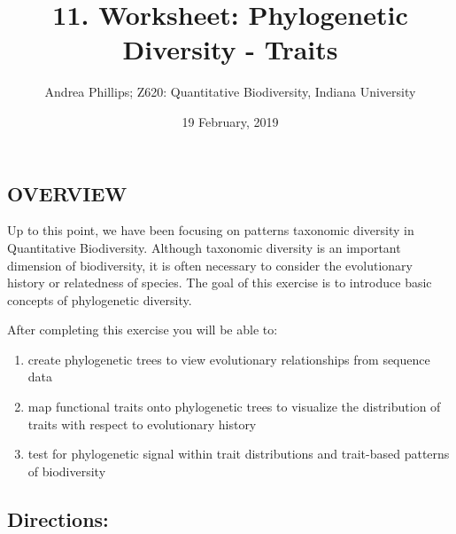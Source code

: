\documentclass[]{article}
\title{11. Worksheet: Phylogenetic Diversity - Traits}
\author{Andrea Phillips; Z620: Quantitative Biodiversity, Indiana University}
\date{19 February, 2019}
\providecommand{\tightlist}{%
  \setlength{\itemsep}{0pt}\setlength{\parskip}{0pt}}
\begin{document}
\maketitle

\subsection{OVERVIEW}\label{overview}

Up to this point, we have been focusing on patterns taxonomic diversity
in Quantitative Biodiversity. Although taxonomic diversity is an
important dimension of biodiversity, it is often necessary to consider
the evolutionary history or relatedness of species. The goal of this
exercise is to introduce basic concepts of phylogenetic diversity.

After completing this exercise you will be able to:

\begin{enumerate}
\def\labelenumi{\arabic{enumi}.}
\tightlist
\item
  create phylogenetic trees to view evolutionary relationships from
  sequence data
\item
  map functional traits onto phylogenetic trees to visualize the
  distribution of traits with respect to evolutionary history
\item
  test for phylogenetic signal within trait distributions and
  trait-based patterns of biodiversity
\end{enumerate}

\subsection{Directions:}\label{directions}
\end{document}
